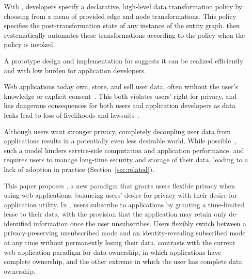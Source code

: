 With \sys, developers specify a declarative, high-level data transformation policy by choosing from a menu of
provided edge and node transformations. This policy specifies the post-transformation state of any instance of the
entity graph. \sys then systematically automates these transformations according to the policy when
the policy is invoked.

A prototype design and implementation for \sys suggests it can be realized
efficiently and with low burden for application developers.

\iffalse
%
%
Web applications today own, store, and sell user data, often without the user's knowledge or
explicit consent~\cite{nytimes:fb, npr:data}. This both violates users' right for privacy, and has
dangerous consequences for both users and application developers as data leaks lead to loss of
livelihoods and lawsuits~\cite{breach:amazon,breach:twitter, breach:fb, breach:marriott,
breach:quora}. 

Although users want stronger privacy, completely decoupling user data from applications results in a
potentially even less desirable world. While possible~\cite{solid, amber, w5, blockstack, bstore}, such a
model hinders service-side computation and application performance, and requires users to manage
long-time security and storage of their data, leading to a lack of adoption in practice (Section~\ref{sec:related}).  

This paper proposes \name, a new paradigm that grants users flexible privacy when using web
applications, balancing users' desire for privacy with their desire for application utility. In
\name, users subscribe to applications by granting a time-limited lease to their data, with the
provision that the application may retain only de-identified information once the user unsubscribes.
Users flexibly switch between a privacy-preserving unsubscribed mode and an identity-revealing
subscribed mode at any time without permanently losing their data. \name contrasts
with the current web application paradigm for data ownership, in which applications have complete
ownership, and the other extreme in which the user has complete data ownership.%

